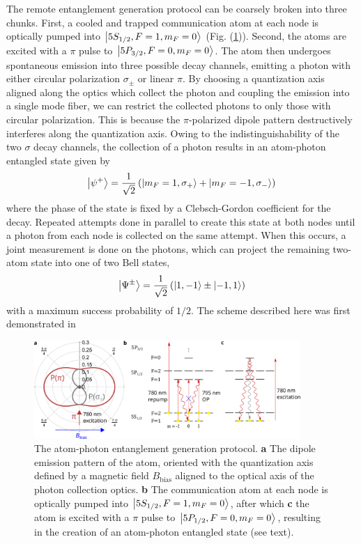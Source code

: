 The remote entanglement generation protocol can be coarsely broken into three chunks. First, a cooled and trapped communication atom at each node is optically pumped into $\ket{5S_{1/2},F=1,m_F=0}$ (Fig. (\ref{fig:entanglement_generation_steps})). Second, the atoms are excited with a $\pi$ pulse to $\ket{5P_{3/2},F=0,m_F=0}$. The atom then undergoes spontaneous emission into three possible decay channels, emitting a photon with either circular polarization $\sigma_{\pm}$ or linear $\pi$. By choosing a quantization axis aligned along the optics which collect the photon and coupling the emission into a single mode fiber, we can restrict the collected photons to only those with circular polarization. This is because the $\pi$-polarized dipole pattern destructively interferes along the quantization axis. Owing to the indistinguishability of the two $\sigma$ decay channels, the collection of a photon results in an atom-photon entangled state given by
\begin{equation}\label{eq:atomphotonstates}
    \ket{\psi^+}=\frac{1}{\sqrt{2}}\left(\ket{m_F=1, \sigma_+}+\ket{m_F=-1,\sigma_-}\right)
\end{equation}
where the phase of the state is fixed by a Clebsch-Gordon coefficient for the decay. Repeated attempts done in parallel to create this state at both nodes until a photon from each node is collected on the same attempt. When this occurs, a joint measurement is done on the photons, which can project the remaining two-atom state into one of two Bell states,
\begin{equation}\label{eq:atomatomstates}
    \ket{\Psi^{\pm}} =\frac{1}{\sqrt{2}}\left(\ket{1,-1}\pm\ket{-1,1}\right)
\end{equation}
with a maximum success probability of $1/2$. The scheme described here was first demonstrated in \cite{Hofmann2012}

\begin{figure}[!ht]
    \centering
    \includegraphics[width=0.9\textwidth]{Images/rb87_atomphoton_entanglement_and_photon_emission_pattern2.pdf}
    \caption{The atom-photon entanglement generation protocol. \textbf{a} The dipole emission pattern of the atom, oriented with the quantization axis defined by a magnetic field $B_{\text{bias}}$ aligned to the optical axis of the photon collection optics. \textbf{b} The communication atom at each node is optically pumped into $\ket{5S_{1/2},F=1,m_F=0}$, after which \textbf{c} the atom is excited with a $\pi$ pulse to $\ket{5P_{1/2},F=0,m_F=0}$, resulting in the creation of an atom-photon entangled state (see text).}
    \label{fig:entanglement_generation_steps}
\end{figure}

